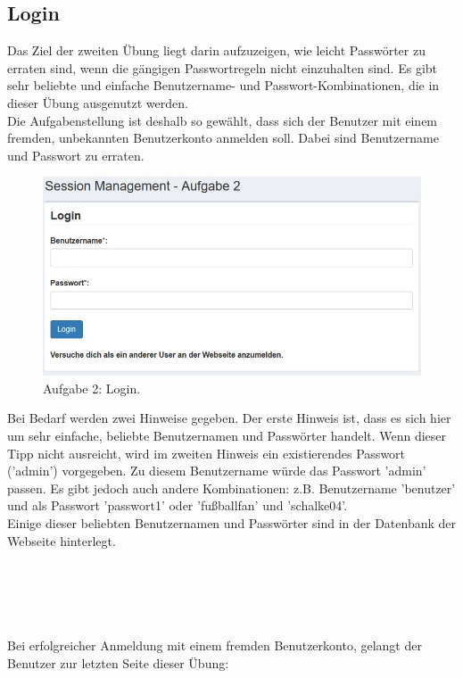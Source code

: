 \subsection{Login}
Das Ziel der zweiten Übung liegt darin aufzuzeigen, wie leicht Passwörter zu erraten sind, wenn die gängigen Passwortregeln nicht einzuhalten sind. Es gibt sehr beliebte und einfache Benutzername- und Passwort-Kombinationen, die in dieser Übung ausgenutzt werden.\\ 
Die Aufgabenstellung ist deshalb so gewählt, dass sich der Benutzer mit einem fremden, unbekannten Benutzerkonto anmelden soll. Dabei sind Benutzername und Passwort zu erraten. \\
\begin{figure}[H]
	\includegraphics[width=1.0\linewidth]{images/BrokenAuthenticationAndSessionManagement/Login_Start}
	\caption[Aufgabe 2: Login.]{Aufgabe 2: Login.}
	\label{fig:Aufgabe 2 Login}
\end{figure}
\noindent Bei Bedarf werden zwei Hinweise gegeben. Der erste Hinweis ist, dass es sich hier um sehr einfache, beliebte Benutzernamen und Passwörter handelt. Wenn dieser Tipp nicht ausreicht, wird im zweiten Hinweis ein existierendes Passwort ('admin') vorgegeben. Zu diesem Benutzername würde das Passwort 'admin' passen. Es gibt jedoch auch andere Kombinationen: z.B. Benutzername 'benutzer' und als Passwort 'passwort1' oder 'fußballfan' und 'schalke04'.\\
Einige dieser beliebten Benutzernamen und Passwörter sind in der Datenbank der Webseite hinterlegt.\\\\\\\\\\\\
Bei erfolgreicher Anmeldung mit einem fremden Benutzerkonto, gelangt der Benutzer zur letzten Seite dieser Übung:
